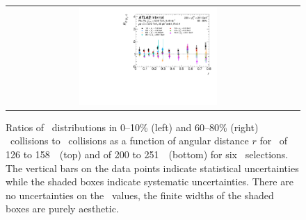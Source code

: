 \begin{figure}[h]
{\begin{tabular}{cc}
            \includegraphics[width=0.5\textwidth]{figures/results/RDpT_final_ratio_dR_CONF_data_jet9_cent5.pdf} \\
      \end{tabular}
      }
\caption{Ratios of \Dptr\ distributions in 0--10\% (left) and 60--80\% (right) \PbPb\ collisions to \pp\ collisions as a function of angular distance $r$ for \ptjet\ of 126 to 158~\GeV\ (top) and of 200 to 251~\GeV\ (bottom) for six \pt\ selections.  The vertical bars on the data points indicate statistical uncertainties while the shaded boxes indicate systematic uncertainties. There are no uncertainties on the \rvar\ values, the finite widths of the shaded boxes are purely aesthetic.}
\label{fig:rdptr}
\end{figure}

